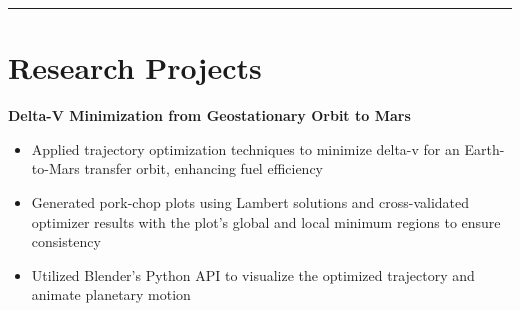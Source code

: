 \documentclass[10pt]{article}
\newcommand{\sectionline}{\noindent\rule{\linewidth}{0.4pt}}
\begin{document}
	\sectionline
	
	\section*{Research Projects}
	
	\textbf{Delta-V Minimization from Geostationary Orbit to Mars}
	\begin{itemize}
		\item Applied trajectory optimization techniques to minimize delta-v for an Earth-to-Mars transfer orbit, enhancing fuel efficiency
		\item Generated pork-chop plots using Lambert solutions and cross-validated optimizer results with the plot’s global and local minimum regions to ensure consistency
		\item Utilized Blender’s Python API to visualize the optimized trajectory and animate planetary motion
	\end{itemize}
	
\end{document}
